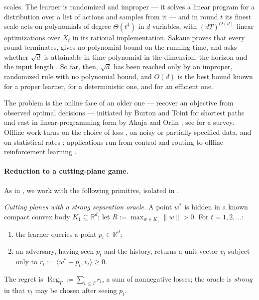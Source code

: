 \documentclass[11pt]{article}
\theoremstyle{plain}
\theoremstyle{definition}
\theoremstyle{remark}
\DeclareMathOperator{\Reg}{Reg}
\newcommand{\R}{\mathbb{R}}
\newcommand{\wstar}{w^{\ast}}
\newcommand{\ip}[2]{\langle #1, #2\rangle}
\begin{document}
scales. The learner is randomized and improper --- it solves a linear program for a distribution
over a list of actions and samples from it --- and in round $t$ its finest scale acts on polynomials
of degree $\Theta(t^{4})$ in $d$ variables, with $(dT)^{O(d)}$ linear optimizations over $X_t$ in
its rational implementation.
Sakaue proves that every round terminates, gives no polynomial bound on the running time, and asks
whether $\sqrt d$ is attainable in time polynomial in the dimension, the horizon and the input
length \cite[Section~7]{SakaueMMW}. So far, then, $\sqrt d$ has been reached only by an
improper, randomized rule with no polynomial bound, and $O(d)$ is the best bound known for a proper
learner, for a deterministic one, and for an efficient one.

The problem is the online face of an older one --- recover an objective from observed optimal
decisions --- initiated by Burton and Toint \cite{BurtonToint} for shortest paths and cast in
linear-programming form by Ahuja and Orlin \cite{AhujaOrlin}; see \cite{ChanSurvey} for a survey.
Offline work turns on the choice of loss \cite{Keshavarz11,Bertsimas15,MohajerinEsfahani18,
Zattoni25}, on noisy \cite{Aswani18} or partially specified \cite{Ren25} data, and on statistical
rates \cite{Fatemi26}; applications run from control \cite{Akhtar21} and routing
\cite{ZattoniRouting} to offline reinforcement learning \cite{Dimanidis25}.

\paragraph{Reduction to a cutting-plane game.} As in \cite{Cai26}, we work with the following
primitive, isolated in \cite{GGKMPS}.

\smallskip
\noindent\textit{Cutting planes with a strong separation oracle.} A point $\wstar$ is hidden in a
known compact convex body $K_1\subseteq\R^{d}$; let $R:=\max_{w\in K_1}\|w\|>0$. For $t=1,2,\dots$:
\begin{enumerate}
\itemsep0pt \parskip0pt 
\item the learner queries a point $p_t\in\R^{d}$;
\item an adversary, having seen $p_t$ and the history, returns a unit vector $v_t$ subject only to
      $r_t:=\ip{\wstar-p_t}{v_t}\ge0$.
\end{enumerate}
The regret is $\Reg_T:=\sum_{t\le T}r_t$, a sum of nonnegative losses; the oracle is \emph{strong}
in that $v_t$ may be chosen after seeing $p_t$.
\smallskip
\end{document}
